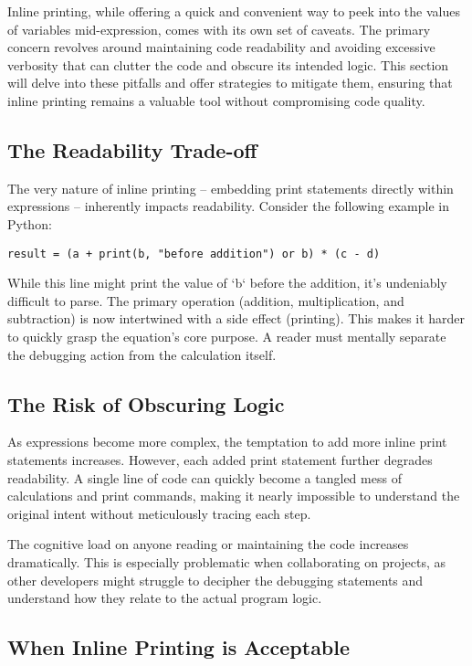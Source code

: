 \documentclass{article}
\begin{document}
{{{{Inline printing, while offering a quick and convenient way to peek into the values of variables mid-expression, comes with its own set of caveats. The primary concern revolves around maintaining code readability and avoiding excessive verbosity that can clutter the code and obscure its intended logic. This section will delve into these pitfalls and offer strategies to mitigate them, ensuring that inline printing remains a valuable tool without compromising code quality.

\subsection*{The Readability Trade-off}

The very nature of inline printing – embedding print statements directly within expressions – inherently impacts readability. Consider the following example in Python:

\begin{verbatim}
result = (a + print(b, "before addition") or b) * (c - d)
\end{verbatim}

While this line might print the value of `b` before the addition, it's undeniably difficult to parse. The primary operation (addition, multiplication, and subtraction) is now intertwined with a side effect (printing).  This makes it harder to quickly grasp the equation's core purpose.  A reader must mentally separate the debugging action from the calculation itself.

\subsection*{The Risk of Obscuring Logic}

As expressions become more complex, the temptation to add more inline print statements increases.  However, each added print statement further degrades readability.  A single line of code can quickly become a tangled mess of calculations and print commands, making it nearly impossible to understand the original intent without meticulously tracing each step.

The cognitive load on anyone reading or maintaining the code increases dramatically.  This is especially problematic when collaborating on projects, as other developers might struggle to decipher the debugging statements and understand how they relate to the actual program logic.

\subsection*{When Inline Printing is Acceptable}

}}}}
\end{document}
